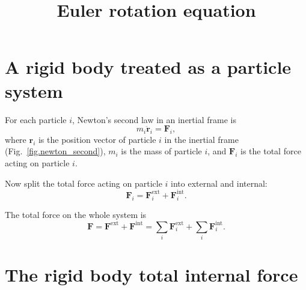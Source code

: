 \documentclass[a4paper,11pt]{article}
\title{\bfseries Euler rotation equation}
\author{}
\date{}
\begin{document}
\maketitle

\section{A rigid body treated as a particle system}

For each particle $i$, Newton's second law in an inertial frame is
\begin{equation}
m_i \ddot{\mathbf r}_i=\mathbf F_i,
\label{eq:newton_second}
\end{equation}
where
$\mathbf r_i$ is the position vector of particle $i$ in the inertial frame
(Fig.~\ref{fig.newton_second}),
$m_i$ is the mass of particle $i$, and
$\mathbf F_i$ is the total force acting on particle $i$.




Now split the total force acting on particle $i$ into external and internal:
\[
\mathbf F_i = \mathbf F_i^{\mathrm{ext}} + \mathbf F_i^{\mathrm{int}}.
\]

The total force on the whole system is
\[
\mathbf F
=
\mathbf F^{\mathrm{ext}} + \mathbf F^{\mathrm{int}}
=
\sum_{i}\mathbf F^{\mathrm{ext}}_i
+
\sum_{i}\mathbf F^{\mathrm{int}}_i.
\]


\section{The rigid body total internal force}
\end{document}
